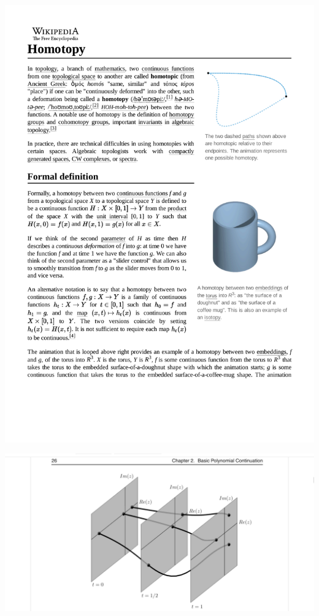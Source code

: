 \documentclass{beamer}
\begin{document}
\begin{frame}
\includegraphics[width=\textwidth]{Homotopy.pdf}
\end{frame}

\begin{frame}
\includegraphics[width=\textwidth]{homotopy.png}
\end{frame}
\end{document}
